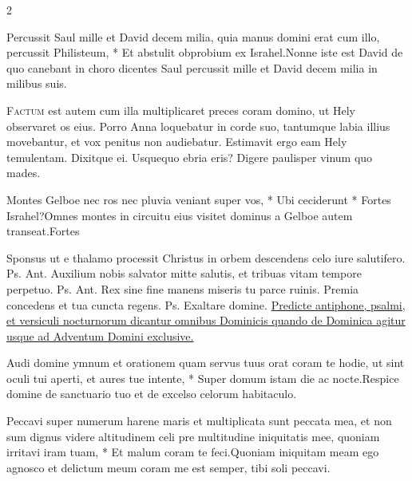 \begin{multicols*}{2}
\begin{responsory}
{Percussit Saul mille et David decem milia, quia manus domini erat cum illo, percussit Philisteum, * Et abstulit obprobium ex Israhel.}{Nonne iste est David de quo canebant in choro dicentes Saul percussit mille et David decem milia in milibus suis.}
\end{responsory}%
\lettrine[lines=2]{\zallmancaps \color{Red} F}{actum} est autem cum illa multiplicaret preces coram domino, ut Hely observaret os eius. Porro Anna loquebatur in corde suo, tantumque labia illius movebantur, et vox penitus non audiebatur. Estimavit ergo eam Hely temulentam. Dixitque ei. Usquequo ebria eris? Digere paulisper vinum quo mades.
\begin{responsory-final}
{Montes Gelboe nec ros nec pluvia veniant super vos, * Ubi ceciderunt * Fortes Israhel?}{Omnes montes in circuitu eius visitet dominus a Gelboe autem transeat.}{Fortes}
\end{responsory-final}%
 Sponsus ut e thalamo processit Christus in orbem descendens celo iure salutifero. {\color{Red} Ps.}  {\color{Red} Ant.} Auxilium nobis salvator mitte salutis, et tribuas vitam tempore perpetuo. {\color{Red} Ps.}  {\color{Red} Ant.} Rex sine fine manens miseris tu parce ruinis. Premia concedens et tua cuncta regens. {\color{Red} Ps.}  \V Exaltare domine.
\newline \ul{Predicte antiphone, psalmi, et versiculi nocturnorum dicantur omnibus Dominicis quando de Dominica agitur usque ad Adventum Domini exclusive.}
\begin{responsory}
{Audi domine ymnum et orationem quam servus tuus orat coram te hodie, ut sint oculi tui aperti, et aures tue intente, * Super domum istam die ac nocte.}{Respice domine de sanctuario tuo et de excelso celorum habitaculo.}
\end{responsory}%
\begin{responsory}
{Peccavi super numerum harene maris et multiplicata sunt peccata mea, et non sum dignus videre altitudinem celi pre multitudine iniquitatis mee, quoniam irritavi iram tuam, * Et malum coram te feci.}{Quoniam iniquitam meam ego agnosco et delictum meum coram me est semper, tibi soli peccavi.}
\end{responsory}%
\begin{responsory-doxology}

\end{responsory-doxology}
\end{multicols*}
